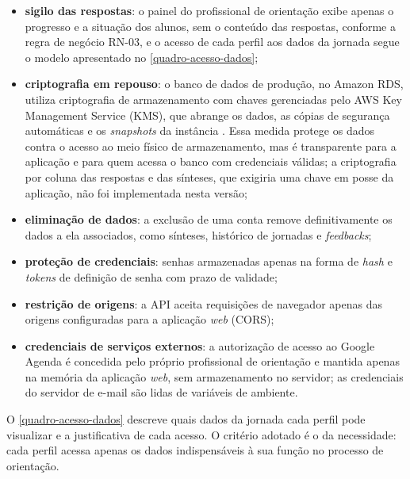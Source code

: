 \begin{itemize}
  \item \textbf{sigilo das respostas}: o painel do profissional de orientação exibe apenas o progresso e a situação dos alunos, sem o conteúdo das respostas, conforme a regra de negócio RN-03, e o acesso de cada perfil aos dados da jornada segue o modelo apresentado no \autoref{quadro-acesso-dados};
  \item \textbf{criptografia em repouso}: o banco de dados de produção, no Amazon RDS, utiliza criptografia de armazenamento com chaves gerenciadas pelo AWS Key Management Service (KMS), que abrange os dados, as cópias de segurança automáticas e os \textit{snapshots} da instância \cite{aws2026rdscriptografia}. Essa medida protege os dados contra o acesso ao meio físico de armazenamento, mas é transparente para a aplicação e para quem acessa o banco com credenciais válidas; a criptografia por coluna das respostas e das sínteses, que exigiria uma chave em posse da aplicação, não foi implementada nesta versão;
  \item \textbf{eliminação de dados}: a exclusão de uma conta remove definitivamente os dados a ela associados, como sínteses, histórico de jornadas e \textit{feedbacks};
  \item \textbf{proteção de credenciais}: senhas armazenadas apenas na forma de \textit{hash} e \textit{tokens} de definição de senha com prazo de validade;
  \item \textbf{restrição de origens}: a API aceita requisições de navegador apenas das origens configuradas para a aplicação \textit{web} (CORS);
  \item \textbf{credenciais de serviços externos}: a autorização de acesso ao Google Agenda é concedida pelo próprio profissional de orientação e mantida apenas na memória da aplicação \textit{web}, sem armazenamento no servidor; as credenciais do servidor de e-mail são lidas de variáveis de ambiente.
\end{itemize}

O \autoref{quadro-acesso-dados} descreve quais dados da jornada cada perfil pode visualizar e a justificativa de cada acesso. O critério adotado é o da necessidade: cada perfil acessa apenas os dados indispensáveis à sua função no processo de orientação.

